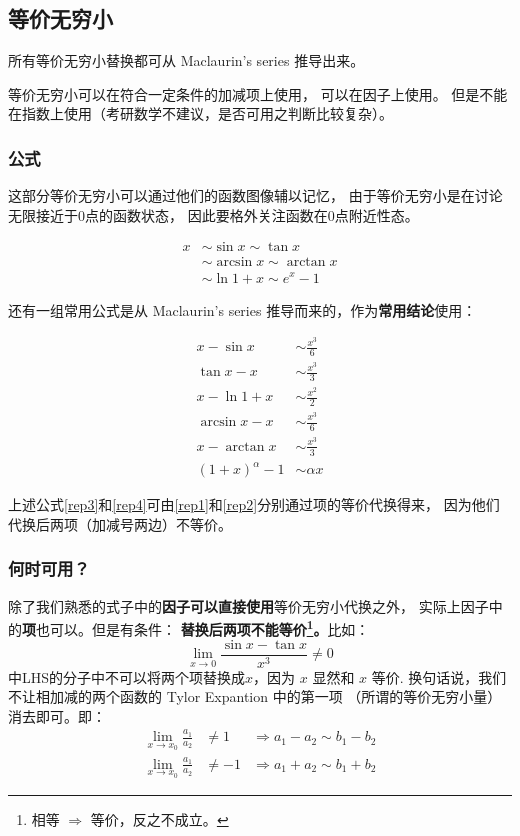 \subsection{等价无穷小}  \label{super-small}
所有等价无穷小替换都可从 Maclaurin's series 推导出来。

等价无穷小可以在符合一定条件的加减项上使用，
可以在因子上使用。
但是不能在指数上使用（考研数学不建议，是否可用之判断比较复杂）。

\subsubsection{公式}
这部分等价无穷小可以通过他们的函数图像辅以记忆，
由于等价无穷小是在讨论无限接近于0点的函数状态，
因此要格外关注函数在0点附近性态。
\begin{lemma}[等价无穷小]
	\begin{align}
		x&\sim\sin{x}\sim\tan{x} \\ 
		&\sim\arcsin{x}\sim\arctan{x} \\
		&\sim\ln{1+x}\sim e^x-1
	\end{align}
\end{lemma}

还有一组常用公式是从 Maclaurin's series 推导而来的，作为\textbf{常用结论}使用：
\begin{lemma}[等价无穷小]
	\begin{align}
		x - \sin{x}     &\sim \frac{x^3}{6} \label{rep1} \\
		\tan{x} - x     &\sim \frac{x^3}{3} \label{rep2} \\
		x - \ln{1+x}    &\sim \frac{x^2}{2} \\
		\arcsin{x} - x  &\sim \frac{x^3}{6} \label{rep3}\\
		x - \arctan{x}  &\sim \frac{x^3}{3} \label{rep4}\\
		(1+x)^\alpha-1  &\sim \alpha x
	\end{align}
\end{lemma}
上述公式\eqref{rep3}和\eqref{rep4}可由\eqref{rep1}和\eqref{rep2}分别通过项的等价代换得来，
因为他们代换后两项（加减号两边）不等价。

\subsubsection{何时可用？}
除了我们熟悉的式子中的\textbf{因子可以直接使用}等价无穷小代换之外，
实际上因子中的\textbf{项}也可以。但是有条件：
\textbf{替换后两项不能等价\footnote{相等 $\Rightarrow$ 等价，反之不成立。}。}比如：
\[
\lim_{x \to 0} \frac{\sin{x} - \tan{x} }{x^3} \neq 0
\]
中LHS的分子中不可以将两个项替换成$x$，因为 $x$ 显然和 $x$ 等价.
换句话说，我们不让相加减的两个函数的 Tylor Expantion 中的第一项
（所谓的等价无穷小量）消去即可。即：
\begin{align}
	\lim_{ x\to x_0 } \frac{a_1}{a_2} &\neq 1  &\Rightarrow a_1 - a_2 \sim b_1 - b_2 \\
	\lim_{ x\to x_0 } \frac{a_1}{a_2} &\neq -1 &\Rightarrow a_1 + a_2 \sim b_1 + b_2
\end{align}

